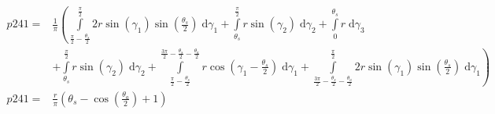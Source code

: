 \begin{align}
    p241 =&\frac{1}{\pi} \left(\int\limits_{\frac{\pi}{2} - \frac{\theta_{s}}{2}}^{\frac{\pi}{2}}2 r \sin{\left (\gamma_{1} \right )} \sin{\left (\frac{\theta_{s}}{2} \right )}\;\mathrm{d}\gamma_{1}+\int\limits_{\theta_{s}}^{\frac{\pi}{2}}r \sin{\left (\gamma_{2} \right )}\;\mathrm{d}\gamma_{2}+\int\limits_{0}^{\theta_{s}}r\;\mathrm{d}\gamma_{3}\right.\\
 &\left.+\int\limits_{\theta_{s}}^{\frac{\pi}{2}}r \sin{\left (\gamma_{2} \right )}\;\mathrm{d}\gamma_{2}+\int\limits_{\frac{\pi}{2} - \frac{\theta_{s}}{2}}^{\frac{3 \pi}{2} - \frac{\theta_{s}}{2} - \frac{\theta_{a}}{2}}r \cos{\left (\gamma_{1} - \frac{\theta_{s}}{2} \right )}\;\mathrm{d}\gamma_{1}+\int\limits_{\frac{3 \pi}{2} - \frac{\theta_{s}}{2} - \frac{\theta_{a}}{2}}^{\frac{\pi}{2}}2 r \sin{\left (\gamma_{1} \right )} \sin{\left (\frac{\theta_{s}}{2} \right )}\;\mathrm{d}\gamma_{1}\right)\\
    p241 =& \frac{r}{\pi} \left(\theta_{s} - \cos{\left (\frac{\theta_{a}}{2} \right )} + 1\right)
\end{align}